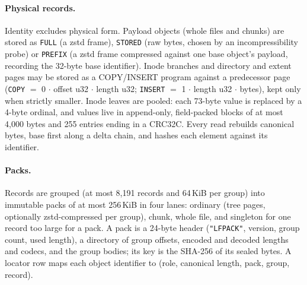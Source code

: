\paragraph{Physical records.} Identity excludes physical form. Payload objects (whole
files and chunks) are stored as \texttt{FULL} (a zstd frame), \texttt{STORED} (raw bytes,
chosen by an incompressibility probe) or \texttt{PREFIX} (a zstd frame compressed against
one base object's payload, recording the 32-byte base identifier). Inode branches and
directory and extent pages may be stored as a COPY/INSERT program against a predecessor
page (\texttt{COPY} $=$ 0 $\cdot$ offset u32 $\cdot$ length u32; \texttt{INSERT} $=$ 1
$\cdot$ length u32 $\cdot$ bytes), kept only when strictly smaller. Inode leaves are
pooled: each 73-byte value is replaced by a 4-byte ordinal, and values live in
append-only, field-packed blocks of at most 4,000 bytes and 255 entries ending in a
CRC32C. Every read rebuilds canonical bytes, base first along a delta chain, and hashes
each element against its identifier.

\paragraph{Packs.} Records are grouped (at most 8,191 records and 64\,KiB per group) into
immutable packs of at most 256\,KiB in four lanes: ordinary (tree pages, optionally
zstd-compressed per group), chunk, whole file, and singleton for one record too large for
a pack. A pack is a 24-byte header (\texttt{"LFPACK"}, version, group count, used
length), a directory of group offsets, encoded and decoded lengths and codecs, and the
group bodies; its key is the SHA-256 of its sealed bytes. A locator row maps each object
identifier to (role, canonical length, pack, group, record).

